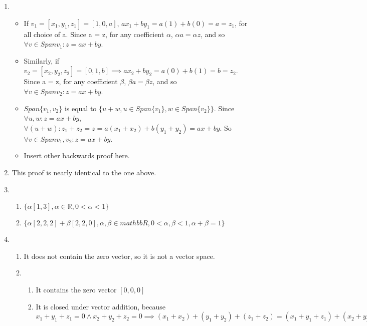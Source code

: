 \documentclass{article}
\begin{document}
    \begin{enumerate}
        \addtocounter{enumi}{3}
        \item 
            \begin{itemize}
                \item If $v_1 = [x_1,y_1,z_1] = [1,0,a]$, $ax_1 + by_1 = a(1) + b(0) = a
                    = z_1$, for all choice of a. Since a = z, for any coefficient
                    $\alpha$, $\alpha a = \alpha z$, and so $\forall v \in Span{v_1}: z = ax + by$.
                \item Similarly, if $v_2 = [x_2,y_2,z_2] = [0,1,b] \implies ax_2 + by_2 = a(0) + b(1) = b = z_2$.
                     Since a = z, for any coefficient $\beta$, $\beta a = \beta z$, and so $\forall v \in Span{v_2}: z = ax + by$.
                 \item $Span\{v_1, v_2\}$ is equal to $\{u + w, u \in Span\{v_1\}, w \in Span\{v_2\}\}$. Since $\forall u, w: z = ax+by$,
                     $\forall (u+w):  z_1 + z_2 = z = a(x_1 + x_2) + b(y_1 + y_2) = ax + by$. So $\forall v \in Span{v_1, v_2}: z = ax + by$.
                 \item Insert other backwards proof here.
            \end{itemize}
        \item This proof is nearly identical to the one above.
        \item 
            \begin{enumerate}
                \item $\{\alpha [1,3], \alpha \in \mathbb{R}, 0 < \alpha < 1\}$
                \item $\{\alpha [2,2,2] + \beta [2,2,0], \alpha,\beta \in mathbb{R}, 0 < \alpha, \beta < 1, \alpha + \beta = 1\}$
            \end{enumerate}
        \item
            \begin{enumerate}
                \item It does not contain the zero vector, so it is not a vector space.
                \item 
                    \begin{enumerate}
                        \item It contains the zero vector $[0,0,0]$
                        \item It is closed under vector addition, because $x_1 + y_1 + z_1 = 0 \land x_2 + y_2 + z_2 = 0 \implies (x_1 + x_2) + (y_1 + y_2) + (z_1 + z_2) = (x_1 + y_1 + z_1) + (x_2 + y_2 + z_2) = 0 + 0 = 0$

\end{enumerate}
\end{enumerate}
\end{enumerate}
\end{document}
